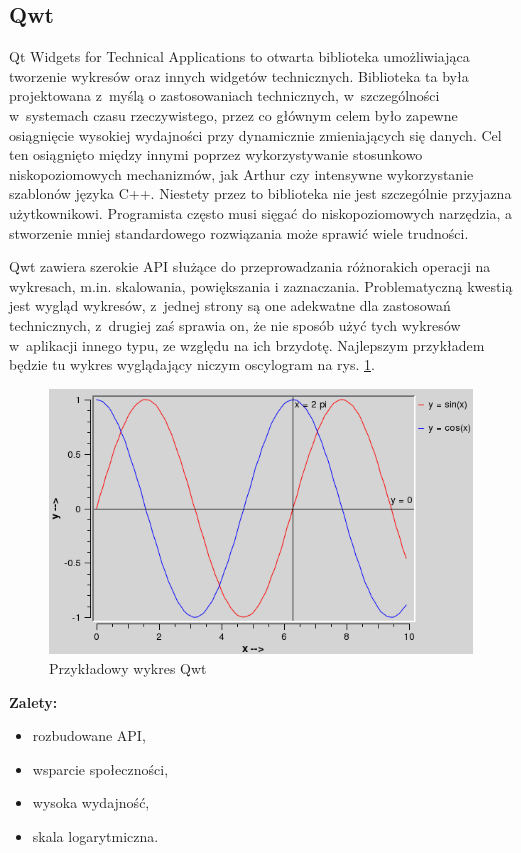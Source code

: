 \documentclass[11pt,twoside,a4paper,final]{llncs}
\begin{document}
\subsection{Qwt}
Qt Widgets for Technical Applications to otwarta biblioteka umożliwiająca tworzenie wykresów oraz innych widgetów technicznych. Biblioteka ta była projektowana z~myślą o zastosowaniach technicznych, w~szczególności w~systemach czasu rzeczywistego, przez co głównym celem było zapewne osiągnięcie wysokiej wydajności przy dynamicznie zmieniających się danych. Cel ten osiągnięto między innymi poprzez wykorzystywanie stosunkowo niskopoziomowych mechanizmów, jak Arthur czy intensywne wykorzystanie szablonów języka C++. Niestety przez to biblioteka nie jest szczególnie przyjazna użytkownikowi. Programista często musi sięgać do niskopoziomowych narzędzia, a stworzenie mniej standardowego rozwiązania może sprawić wiele trudności.\newline

Qwt zawiera szerokie API służące do przeprowadzania różnorakich operacji na wykresach, m.in. skalowania, powiększania i zaznaczania. Problematyczną kwestią jest wygląd wykresów, z~jednej strony są one adekwatne dla zastosowań technicznych, z~drugiej zaś sprawia on, że nie sposób użyć tych wykresów w~aplikacji innego typu, ze względu na ich brzydotę. Najlepszym przykładem będzie tu wykres wyglądający niczym oscylogram na rys. \ref{rys:wykres:sinus}.
\begin{figure}
\centering
\caption{Przykładowy wykres Qwt}\label{rys:wykres:sinus}
\includegraphics[scale=0.4]{sinus.png}
\end{figure}

\textbf{Zalety:}
\begin{itemize}
\item{rozbudowane API,}
\item{wsparcie społeczności,}
\item{wysoka wydajność,}
\item{skala logarytmiczna.}\newline
\end{itemize}
\end{document}
